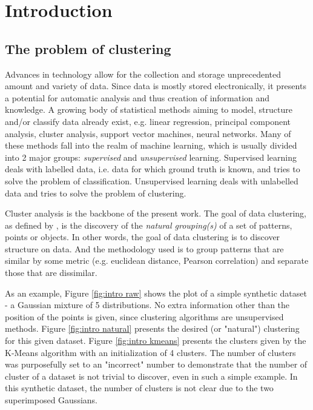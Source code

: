 \chapter{Introduction}
\label{chapter:introduction}


\section{The problem of clustering}
\label{sec:clustering}

Advances in technology allow for the collection and storage unprecedented amount and variety of data.
Since data is mostly stored electronically, it presents a potential for automatic analysis and thus creation of information and knowledge.
A growing body of statistical methods aiming to model, structure and/or classify data already exist, e.g. linear regression, principal component analysis, cluster analysis, support vector machines, neural networks.
Many of these methods fall into the realm of machine learning, which is usually divided into 2 major groups: \textit{supervised} and \textit{unsupervised} learning.
Supervised learning deals with labelled data, i.e. data for which ground truth is known, and tries to solve the problem of classification. Unsupervised learning deals with unlabelled data and tries to solve the problem of clustering.

Cluster analysis is the backbone of the present work.
The goal of data clustering, as defined by \cite{Jain2010}, is the discovery of the \textit{natural grouping(s)} of a set of patterns, points or objects. In other words, the goal of data clustering is to discover structure on data.
And the methodology used is to group patterns that are similar by some metric (e.g. euclidean distance, Pearson correlation) and separate those that are dissimilar. %

As an example, Figure \ref{fig:intro raw} shows the plot of a simple synthetic dataset - a Gaussian mixture of 5 distributions.
No extra information other than the position of the points is given, since clustering algorithms are unsupervised methods.
Figure \ref{fig:intro natural} presents the desired (or "natural") clustering for this given dataset.
Figure \ref{fig:intro kmeans} presents the clusters given by the K-Means algorithm with an initialization of 4 clusters.
The number of clusters was purposefully set to an "incorrect" number to demonstrate that the number of cluster of a dataset is not trivial to discover, even in such a simple example. In this synthetic dataset, the number of clusters is not clear due to the two superimposed Gaussians.

